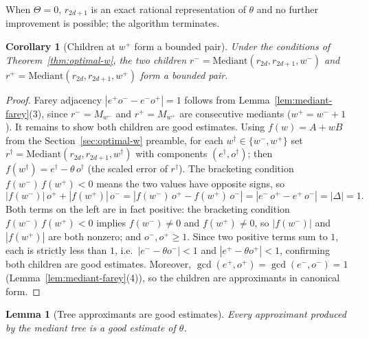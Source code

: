\documentclass[12pt]{article}
\newtheorem{lemma}[theorem]{Lemma}
\newtheorem{corollary}[theorem]{Corollary}
\theoremstyle{definition}
\theoremstyle{remark}
\theoremstyle{plain}
\newcommand{\Kval}{\Theta}
\newcommand{\Dval}{\Delta}
\newcommand{\wplus}{w^{+}}
\newcommand{\wminus}{w^{-}}
\newcommand{\rplus}{r^{+}}
\newcommand{\rminus}{r^{-}}
\newcommand{\eplus}{e^{+}}
\newcommand{\eminus}{e^{-}}
\newcommand{\odenp}{o^{+}}
\newcommand{\odenm}{o^{-}}
\begin{document}
When $\Kval = 0$, $r_{2d+1}$ is an exact rational representation of $\theta$
and no further improvement is possible; the algorithm terminates.

\begin{corollary}[Children at $\wplus$ form a bounded pair]
\label{cor:children-bounded-pair}
Under the conditions of Theorem~\ref{thm:optimal-w}, the two children
$\rminus = \mathrm{Mediant}(r_{2d}, r_{2d+1}, \wminus)$ and
$\rplus = \mathrm{Mediant}(r_{2d}, r_{2d+1}, \wplus)$ form a bounded pair.
\end{corollary}

\begin{proof}
Farey adjacency $|\eplus\odenm - \eminus\odenp| = 1$ follows from
Lemma~\ref{lem:mediant-farey}(3), since $\rminus = M_{\wminus}$ and $\rplus = M_{\wplus}$
are consecutive mediants ($\wplus = \wminus + 1$).
It remains to show both children are good estimates.
Using $f(w) = A + wB$ from the Section~\ref{sec:optimal-w} preamble, for each
$w^\dagger \in \{\wminus, \wplus\}$ set $r^\dagger = \mathrm{Mediant}(r_{2d}, r_{2d+1}, w^\dagger)$
with components $(e^\dagger, o^\dagger)$; then $f(w^\dagger) = e^\dagger - \theta\, o^\dagger$
(the scaled error of $r^\dagger$).
The bracketing condition $f(\wminus)\,f(\wplus) < 0$ means the two values have opposite signs,
so
\[
  |f(\wminus)|\,\odenp + |f(\wplus)|\,\odenm
  = |f(\wminus)\,\odenp - f(\wplus)\,\odenm|
  = |\eminus\,\odenp - \eplus\,\odenm|
  = |\Dval| = 1.
\]
Both terms on the left are in fact positive: the bracketing condition
$f(\wminus)\,f(\wplus) < 0$ implies $f(\wminus) \neq 0$ and $f(\wplus) \neq 0$,
so $|f(\wminus)|$ and $|f(\wplus)|$ are both nonzero; and $\odenm, \odenp \geq 1$.
Since two positive terms sum to $1$, each is strictly less than $1$,
i.e.\ $|\eminus - \theta \odenm| < 1$ and $|\eplus - \theta \odenp| < 1$,
confirming both children are good estimates.
Moreover, $\gcd(\eplus, \odenp) = \gcd(\eminus, \odenm) = 1$
(Lemma~\ref{lem:mediant-farey}(4)), so the children are approximants in canonical form.
\end{proof}

\begin{lemma}[Tree approximants are good estimates]
\label{lem:tree-good-estimate}
Every approximant produced by the mediant tree is a good estimate of $\theta$.
\end{lemma}
\end{document}
